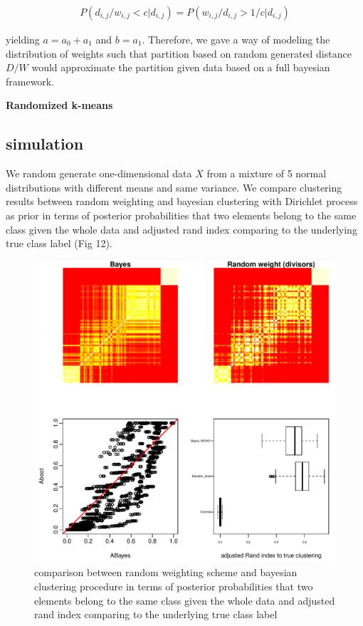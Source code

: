 \documentclass[aoas,preprint]{imsart}
\begin{document}
\begin{eqnarray*}
P(d_{i,j} / w_{i,j} < c | d_{i,j}) = P(w_{i,j} / d_{i,j} > 1 / c | d_{i,j})
\end{eqnarray*}

yielding $a = a_0 + a_1$ and $b = a_1$.  Therefore, we gave a way of modeling the distribution of weights such that partition based on random generated distance $D / W$ would approximate the partition given data based on a full bayesian framework.





\noindent
{\bf Randomized k-means}
\subsection{simulation}
We random generate one-dimensional data $X$ from a mixture of 5 normal distributions with different means and same variance. We compare clustering results between random weighting and bayesian clustering with Dirichlet process as prior in terms of posterior probabilities that two elements belong to the same class given the whole data and adjusted rand index comparing to the underlying true class label (Fig 12). 

\begin{figure}[h]
\includegraphics[scale = 1]{Figs/try7-g.pdf}
 \caption{comparison between random weighting scheme and bayesian clustering procedure in terms of posterior probabilities that two elements belong to the same class given the whole data and adjusted rand index comparing to the underlying true class label}
  \label{fig:1}
\end{figure}
\end{document}
